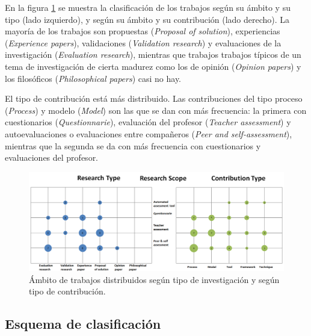 En la figura \ref{fig:Burble} se muestra la clasificación de los trabajos según su ámbito y su tipo (lado izquierdo), y según su ámbito y su contribución (lado derecho). La mayoría de los trabajos son propuestas (\emph{Proposal of solution}), experiencias (\emph{Experience papers}), validaciones (\emph{Validation research}) y evaluaciones de la investigación (\emph{Evaluation research}), mientras que trabajos trabajos típicos de un tema de investigación de cierta madurez como los de opinión (\emph{Opinion papers}) y los filosóficos (\emph{Philosophical papers}) casi no hay. %

El tipo de contribución está más distribuido. Las contribuciones del tipo proceso (\emph{Process}) y modelo (\emph{Model}) son las que se dan con más frecuencia: la primera con cuestionarios (\emph{Questionnarie}), evaluación del profesor (\emph{Teacher assessment}) y autoevaluaciones o evaluaciones entre compañeros (\emph{Peer and self-assessment}), mientras que la segunda se da con más frecuencia con cuestionarios y evaluaciones del profesor. 

\pagestyle{empty}
\begin{landscape}
\begin{figure}[H]
  \begin{center}
    \includegraphics[scale=0.4]{Burbujas.png}
  \end{center}
  \caption{Ámbito de trabajos distribuidos según tipo de investigación y según tipo de contribución.}
  \label{fig:Burble}
\end{figure}
\end{landscape}
\pagestyle{fancy}


\subsection{Esquema de clasificación}

